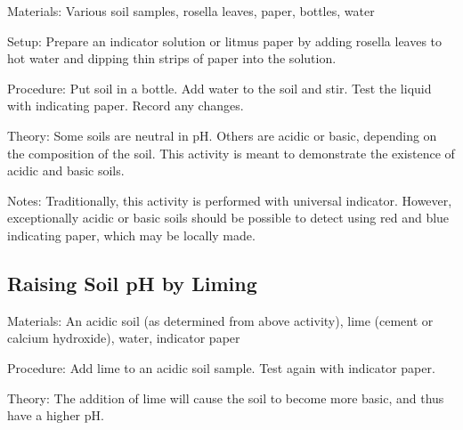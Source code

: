 \begin{multicols}{2}
\begin{description*}
\item[Materials:]{Various soil samples, rosella leaves, paper, bottles, water}
\item[Setup:]{Prepare an indicator solution or litmus paper by adding rosella leaves to hot water and dipping thin strips of paper into the solution.}
\item[Procedure:]{Put soil in a bottle. Add water to the soil and stir. Test the liquid with indicating paper. Record any changes.}
\item[Theory:]{Some soils are neutral in pH. Others are acidic or basic, depending on the composition of the soil. This activity is meant to demonstrate the existence of acidic and basic soils. }
\item[Notes:]{Traditionally, this activity is performed with universal indicator. However, exceptionally acidic or basic soils should be possible to detect using red and blue indicating paper, which may be locally made.}
\end{description*}

\vfill
\columnbreak

\subsection{Raising Soil pH by Liming}


\begin{description*}
\item[Materials:]{An acidic soil (as determined from above activity), lime (cement or calcium hydroxide), water, indicator paper}
\item[Procedure:]{Add lime to an acidic soil sample. Test again with indicator paper.}
\item[Theory:]{The addition of lime will cause the soil to become more basic, and thus have a higher pH.}
\end{description*}


\end{multicols}
